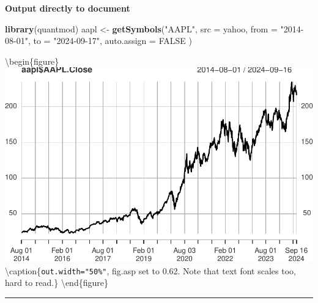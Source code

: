 \documentclass[
  a4paper,
  twoside,
  openright]{book}
\newenvironment{Shaded}{\begin{snugshade}}{\end{snugshade}}
\newcommand{\AttributeTok}[1]{\textcolor[rgb]{0.13,0.29,0.53}{#1}}
\newcommand{\ConstantTok}[1]{\textcolor[rgb]{0.56,0.35,0.01}{#1}}
\newcommand{\FunctionTok}[1]{\textcolor[rgb]{0.13,0.29,0.53}{\textbf{#1}}}
\newcommand{\InformationTok}[1]{\textcolor[rgb]{0.56,0.35,0.01}{\textbf{\textit{#1}}}}
\newcommand{\NormalTok}[1]{#1}
\newcommand{\OtherTok}[1]{\textcolor[rgb]{0.56,0.35,0.01}{#1}}
\newcommand{\StringTok}[1]{\textcolor[rgb]{0.31,0.60,0.02}{#1}}
\theoremstyle{definition}
\theoremstyle{definition}
\theoremstyle{definition}
\theoremstyle{definition}
\theoremstyle{remark}
\begin{document}
\textbf{Output directly to document}

\begin{Shaded}
\begin{Highlighting}[]
\FunctionTok{library}\NormalTok{(quantmod)}
\NormalTok{aapl }\OtherTok{\textless{}{-}} \FunctionTok{getSymbols}\NormalTok{(}\StringTok{"AAPL"}\NormalTok{, }
           \AttributeTok{src =} \StringTok{\textquotesingle{}yahoo\textquotesingle{}}\NormalTok{, }
           \AttributeTok{from =} \StringTok{"2014{-}08{-}01"}\NormalTok{, }
           \AttributeTok{to =} \StringTok{"2024{-}09{-}17"}\NormalTok{,   }
           \AttributeTok{auto.assign =} \ConstantTok{FALSE}
\NormalTok{           )}
\end{Highlighting}
\end{Shaded}

\begin{Shaded}
\end{Shaded}

\textbackslash begin\{figure\}
\includegraphics[width=0.5\linewidth]{0206-Rmd-Figure_files/figure-latex/unnamed-chunk-2-1} \textbackslash caption\{\texttt{out.width="50\%"}, fig.asp set to 0.62. Note that text font scales too, hard to read.\}\label{fig:unnamed-chunk-2}
\textbackslash end\{figure\}

\begin{center}\rule{0.5\linewidth}{0.5pt}\end{center}

\begin{Shaded}
\end{Shaded}
\end{document}
